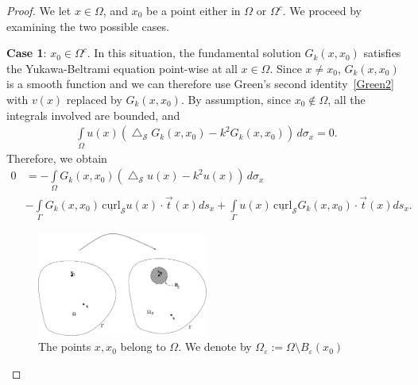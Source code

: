 \documentclass[final]{siamltex}
\newcommand{\lap}{\bigtriangleup}
\renewcommand{\S} {\mathcal{S}}
\begin{document}
\begin{proof} We let $x\in \Omega$, and $x_0$ be a point either in $\Omega$ or $\Omega^c$. 
We proceed by examining the two possible cases.

{\bf Case 1}:  $x_{0} \in \Omega^{c}$.  In this situation, the
fundamental solution $G_{k}(x,x_{0})$ satisfies the Yukawa-Beltrami
equation point-wise at all $x\in \Omega$. Since $x \neq x_0$,
$G_{k}(x,x_0)$ is a smooth function and we can therefore use Green's
second identity~\eqref{Green2} with $v(x)$ replaced by
$G_{k}(x,x_{0})$.  By assumption, since $x_{0} \notin \Omega$, all the
integrals involved are bounded, and 
\begin{align*}
  \int\limits_{\Omega} u(x)(\lap_{\S}G_{k}(x,x_0) 
      -k^{2}G_{k}(x,x_0)) \, d\sigma_x=0.
\end{align*}
Therefore, we obtain
\begin{align*}
 0 &= - \int\limits_{\Omega}
    G_k(x,x_{0})\left(\lap_{\S}u(x) -k^2 u(x)\right)\,d\sigma_x \\
    &-\int\limits_{{\Gamma}} G_k(x,x_{0}) \, \underline{\mbox{curl}}_{\S}
    u(x) \cdot \vec{t}(x) ds_{x} 
 + \int\limits_{{\Gamma}}  u(x)
 \,\underline{\mbox{curl}}_{{\S}} G_k(x,x_0) \cdot \vec{t}(x) ds_{x}.
\end{align*}
\begin{figure}
  \centering
  \includegraphics[width=0.5\textwidth]{proof1}
  \caption{\label{f:proof1} The points $x,x_0$ belong to $\Omega$. We
  denote by $\Omega_\varepsilon:=\Omega\setminus B_{\varepsilon}(x_0)$}
\end{figure}


\end{proof}
\end{document}
